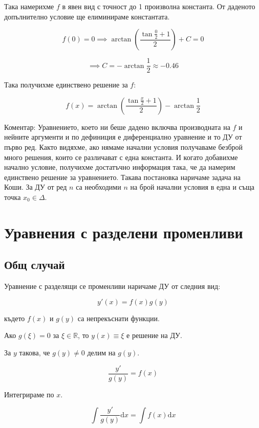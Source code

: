 \documentclass{scrartcl}
\begin{document}
\begin{FlushLeft}
Така намерихме $f$ в явен вид с точност до 1 произволна константа.
От даденото допълнително условие ще елиминираме константата.
\end{FlushLeft}

$$f(0) = 0 \implies \arctan{\left(\dfrac{\tan{\frac{0}{2}}+1}{2}\right)} + C = 0$$

$$\implies C = -\arctan{\dfrac{1}{2}} \approx -0.46$$

\begin{FlushLeft}
Така получихме единствено решение за $f$:
\end{FlushLeft}

$$f(x) = \arctan{\left(\dfrac{\tan{\frac{x}{2}}+1}{2}\right)} - \arctan{\frac{1}{2}}$$

\begin{FlushLeft}
Коментар: Уравнението, което ни беше дадено включва производната на $f$ и нейните аргументи и по дефиниция е диференциално уравнение и то ДУ от първо ред. Както видяхме, ако нямаме начални условия получаваме безброй много решения, които се различават с една константа. И когато добавихме начално условие, получихме достатъчно информация така, че да намерим единствено решение за уравнението. Такава постановка наричаме задача на Коши. За ДУ от ред $n$ са необходими $n$ на брой начални условия в една и съща точка $x_0 \in \Delta$.
\end{FlushLeft}

\section{Уравнения с разделени променливи}

\subsection{Общ случай}

Уравнение с разделящи се променливи наричаме ДУ от следния вид:

$$y'(x) = f(x)g(y)$$

където $f(x)$ и $g(y)$ са непрекъснати функции.

Ако $g(\xi) = 0$ за $\xi \in \mathbb{R}$, то $y(x) \equiv \xi$ е решение на ДУ.

За $y$ такова, че $g(y) \ne 0$ делим на $g(y)$.

$$\dfrac{y'}{g(y)} = f(x)$$

Интегрираме по $x$.

$$\displaystyle\int\dfrac{y'}{g(y)}\mathrm{d}x = \int f(x)\mathrm{d}x$$
\end{document}
